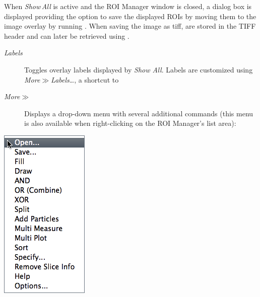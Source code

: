 \begin{minipage}[c][1\totalheight][t]{0.634\columnwidth}%
When \emph{Show\,All }is active and the ROI Manager window is closed,
a dialog box is displayed providing the option to save the displayed
ROIs by moving them to the image overlay by running .
When saving the image as tiff,  are stored
in the TIFF header and can later be retrieved using .%
\end{minipage}
\begin{description}
\item [{\emph{Labels}}] Toggles
overlay labels displayed by \emph{Show All}. Labels are customized
using \emph{More}{\scriptsize $\gg$}\emph{Labels}\ldots{}, a shortcut
to 
\item [{\emph{More}{\scriptsize $\gg$}}] \improvement{}Displays a drop-down
menu with several additional commands (this menu is also available
when right-clicking on the ROI Manager's list area):
\end{description}
\begin{minipage}[c][1\totalheight][t]{0.252\columnwidth}%
\begin{description}
\item [{\includegraphics[scale=0.55]{images/ROIManagerMenu}}]~\end{description}
%
\end{minipage}%
